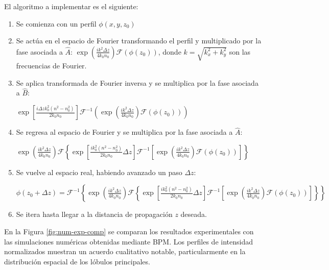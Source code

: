 El algoritmo a implementar es el siguiente: \begin{enumerate}
	\item   Se comienza con un perfil $\phi(x, y, z_0)$
\item   Se actúa en el espacio de Fourier transformando el perfil y multiplicado por la fase asociada a $\hat{A}$: $\exp\left(\frac{ik^2\Delta z}{4k_0 n_0}\right)\mathcal{F}(\phi(z_0))$, donde $k=\sqrt{k_x^2 + k_y^2}$ son las frecuencias de Fourier.
\item   Se aplica transformada de Fourier inversa y se multiplica por la fase asociada a $\hat{B}$: 

$\exp\left[\frac{i\Delta z k_0^2(n^2-n_0^2)}{2 k_0n_0}\right]\mathcal{F}^{-1}\left(\exp\left(\frac{ik^2 \Delta z}{4k_0 n_0}\right)\mathcal{F}(\phi(z_0))\right)$
\item  Se regresa al espacio de Fourier y se multiplica por la fase asociada a $\hat{A}$:
 
$\exp\left(\frac{ik^2\Delta z}{4k_0 n_0}\right)\mathcal{F}\left\{\exp\left[\frac{ik_0^2(n^2-n_0^2)}{2 k_0n_0}\Delta z \right]\mathcal{F}^{-1}\left[\exp\left(\frac{ik^2\Delta z}{4k_0 n_0}\right)\mathcal{F}(\phi(z_0))\right]\right\}$
\item Se vuelve al espacio real, habiendo avanzado un paso $\Delta z$:

$\phi(z_0+\Delta z)=\mathcal{F}^{-1}\left\{\exp\left(\frac{ik^2\Delta z}{4k_0 n_0}\right)\mathcal{F}\left\{\exp\left[\frac{i k_0^2(n^2-n_0^2)}{2 k_0n_0}\Delta z\right]\mathcal{F}^{-1}\left[\exp\left(\frac{ik^2\Delta z}{4k_0 n_0}\right)\mathcal{F}(\phi(z_0))\right]\right\} \right\}$

\item Se itera hasta llegar a la distancia de propagación $z$ deseada.
\end{enumerate} En la Figura \ref{fig:num-exp-comp} se comparan los resultados experimentales con las simulaciones numéricas obtenidas mediante BPM. Los perfiles de intensidad normalizados muestran un acuerdo cualitativo notable, particularmente en la distribución espacial de los lóbulos principales.
